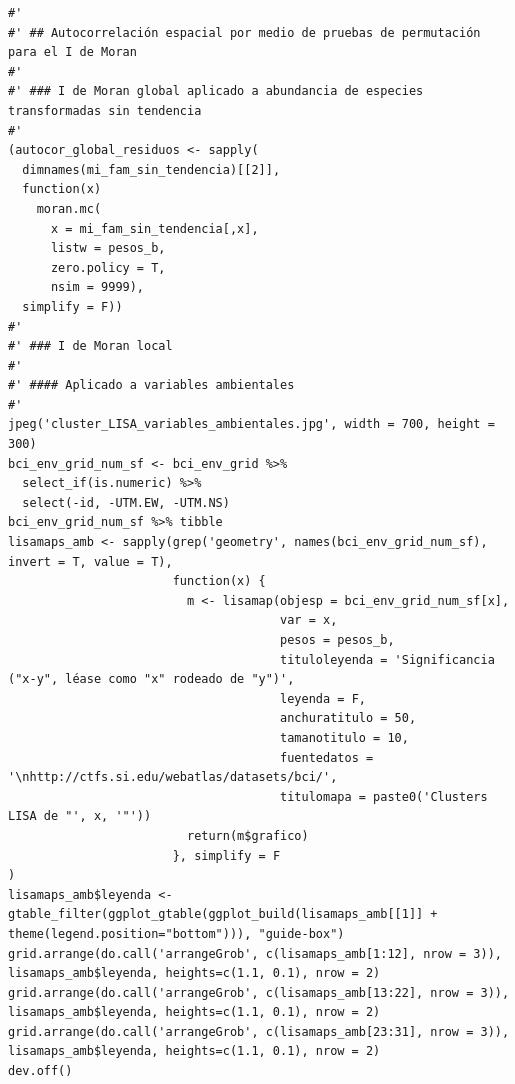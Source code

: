 \documentclass[11pt,]{article}
\begin{document}
\begin{verbatim}
#' 
#' ## Autocorrelación espacial por medio de pruebas de permutación para el I de Moran
#' 
#' ### I de Moran global aplicado a abundancia de especies transformadas sin tendencia
#' 
(autocor_global_residuos <- sapply(
  dimnames(mi_fam_sin_tendencia)[[2]],
  function(x)
    moran.mc(
      x = mi_fam_sin_tendencia[,x],
      listw = pesos_b,
      zero.policy = T,
      nsim = 9999),
  simplify = F))
#' 
#' ### I de Moran local
#' 
#' #### Aplicado a variables ambientales
#' 
jpeg('cluster_LISA_variables_ambientales.jpg', width = 700, height = 300)
bci_env_grid_num_sf <- bci_env_grid %>%
  select_if(is.numeric) %>% 
  select(-id, -UTM.EW, -UTM.NS)
bci_env_grid_num_sf %>% tibble
lisamaps_amb <- sapply(grep('geometry', names(bci_env_grid_num_sf), invert = T, value = T),
                       function(x) {
                         m <- lisamap(objesp = bci_env_grid_num_sf[x],
                                      var = x,
                                      pesos = pesos_b,
                                      tituloleyenda = 'Significancia ("x-y", léase como "x" rodeado de "y")',
                                      leyenda = F,
                                      anchuratitulo = 50,
                                      tamanotitulo = 10,
                                      fuentedatos = '\nhttp://ctfs.si.edu/webatlas/datasets/bci/',
                                      titulomapa = paste0('Clusters LISA de "', x, '"'))
                         return(m$grafico)
                       }, simplify = F
)
lisamaps_amb$leyenda <- gtable_filter(ggplot_gtable(ggplot_build(lisamaps_amb[[1]] + theme(legend.position="bottom"))), "guide-box")
grid.arrange(do.call('arrangeGrob', c(lisamaps_amb[1:12], nrow = 3)), lisamaps_amb$leyenda, heights=c(1.1, 0.1), nrow = 2)
grid.arrange(do.call('arrangeGrob', c(lisamaps_amb[13:22], nrow = 3)), lisamaps_amb$leyenda, heights=c(1.1, 0.1), nrow = 2)
grid.arrange(do.call('arrangeGrob', c(lisamaps_amb[23:31], nrow = 3)), lisamaps_amb$leyenda, heights=c(1.1, 0.1), nrow = 2)
dev.off()


\end{verbatim}
\end{document}

